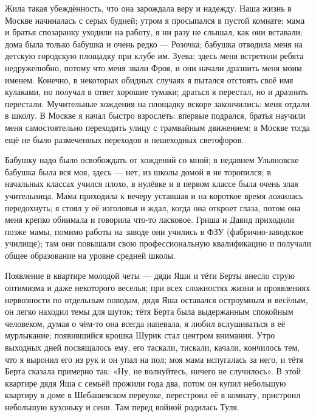 \label{150-1}
Жила такая убеждённость, что она зарождала веру и надежду. Наша жизнь в Москве начиналась с серых будней; утром я просыпался в пустой комнате; мама и братья спозаранку уходили на работу, я ни разу не слышал, как они вставали; дома была только бабушка и очень редко — Розочка; бабушка отводила меня на детскую городскую площадку при клубе им. Зуева; здесь меня встретили ребята недружелюбно, потому что меня звали Фроя, и они начали дразнить меня моим именем. Конечно, в некоторых обидных случаях я пытался отстоять своё имя кулаками, но получал в ответ хорошие тумаки; драться я перестал, но и дразнить перестали. Мучительные хождения на площадку вскоре закончились: меня отдали в школу. В Москве я начал быстро взрослеть: впервые подрался, братья научили меня самостоятельно переходить улицу с трамвайным движением; в Москве тогда ещё не было размеченных переходов и пешеходных светофоров.

\label{151-1}
Бабушку надо было освобождать от хождений со мной; в недавнем Ульяновске бабушка была вся моя, здесь — нет, из школы домой я не торопился; в начальных классах учился плохо, в нулёвке и в первом классе была очень злая учительница. Мама приходила к вечеру уставшая и на короткое время ложилась передохнуть; я стоял у её изголовья и ждал, когда она откроет глаза, потом она меня крепко обнимала и говорила что-то ласковое. Гриша и Давид приходили позже мамы, помимо работы на заводе они учились в ФЗУ (фабрично-заводское училище); там они повышали свою профессиональную квалификацию и получали общее образование на уровне средней школы.

\label{152-1}
Появление в квартире молодой четы — дяди Яши и тёти Берты внесло струю оптимизма и даже некоторого веселья; при всех сложностях жизни и проявлениях нервозности по отдельным поводам, дядя Яша оставался остроумным и весёлым, он легко находил темы для шуток; тётя Берта была выдержанным спокойным человеком, думая о чём-то она всегда напевала, я любил вслушиваться в её мурлыкание; появившийся крошка Шурик стал центром внимания. Утро выходных дней посвящалось ему, его таскали, тискали, качали, кончилось тем, что я выронил его из рук и он упал на пол; моя мама испугалась за него, и тётя Берта сказала примерно так: «Ну, не волнуйтесь, ничего не случилось». В этой квартире дядя Яша с семьёй прожили года два, потом он купил небольшую квартиру в доме в Шебашевском переулке, перестроил её в комнату, пристроил небольшую кухоньку и сени. Там перед войной родилась Туля.

